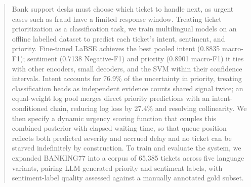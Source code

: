 \begin{abstract}
Bank support desks must choose which ticket to handle next, as urgent cases such as fraud have a limited response window. Treating ticket prioritization as a classification task, we train multilingual models on an offline labelled dataset to predict each ticket's intent, sentiment, and priority. Fine-tuned LaBSE achieves the best pooled intent (0.8835 macro-F1); sentiment (0.7138 Negative-F1) and priority (0.8901 macro-F1) it ties with other encoders, small decoders, and the SVM within their confidence intervals. Intent accounts for 76.9\% of the uncertainty in priority, treating classification heads as independent evidence counts shared signal twice; an equal-weight log pool merges direct priority predictions with an intent-conditioned chain, reducing log loss by 27.4\% and resolving collinearity. We then specify a dynamic urgency scoring function that couples this combined posterior with elapsed waiting time, so that queue position reflects both predicted severity and accrued delay and no ticket can be starved indefinitely by construction. To train and evaluate the system, we expanded BANKING77 into a corpus of 65,385 tickets across five language variants, pairing LLM-generated priority and sentiment labels, with sentiment-label quality assessed against a manually annotated gold subset.
\end{abstract}